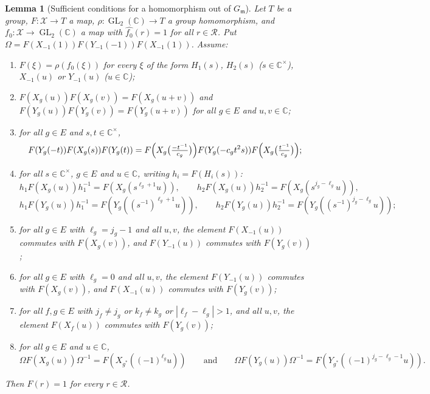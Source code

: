 \documentclass[11pt]{article}
\newtheorem{lemma}[theorem]{Lemma}
\theoremstyle{definition}
\theoremstyle{remark}
\newcommand{\CC}{\mathbb{C}}
\DeclareMathOperator{\GL}{GL}
\begin{document}
\begin{lemma}[Sufficient conditions for a homomorphism out of $G_{\mathfrak m}$]\label{lem:gm_rel_of}
Let $T$ be a group, $F\colon\mathcal X\to T$ a map, $\rho\colon\GL_2(\CC)\to T$ a group homomorphism, and $f_0\colon\mathcal X\to\GL_2(\CC)$ a map with $\widehat{f_0}(r)=1$ for all $r\in\mathcal R$. Put $\Omega=F(X_{-1}(1))F(Y_{-1}(-1))F(X_{-1}(1))$. Assume:
\begin{enumerate}
\item $F(\xi)=\rho(f_0(\xi))$ for every $\xi$ of the form $H_1(s)$, $H_2(s)$ ($s\in\CC^\times$), $X_{-1}(u)$ or $Y_{-1}(u)$ ($u\in\CC$);
\item $F(X_g(u))F(X_g(v))=F(X_g(u+v))$ and $F(Y_g(u))F(Y_g(v))=F(Y_g(u+v))$ for all $g\in E$ and $u,v\in\CC$;
\item for all $g\in E$ and $s,t\in\CC^\times$,
\[
F(Y_g(-t))F(X_g(s))F(Y_g(t))=F\Bigl(X_g\bigl(\tfrac{-t^{-1}}{c_g}\bigr)\Bigr)F(Y_g(-c_gt^2s))F\Bigl(X_g\bigl(\tfrac{t^{-1}}{c_g}\bigr)\Bigr);
\]
\item for all $s\in\CC^\times$, $g\in E$ and $u\in\CC$, writing $h_i=F(H_i(s))$:
\[
h_1F(X_g(u))h_1^{-1}=F(X_g(s^{\ell_g+1}u)),\qquad h_2F(X_g(u))h_2^{-1}=F(X_g(s^{j_g-\ell_g}u)),
\]
\[
h_1F(Y_g(u))h_1^{-1}=F(Y_g((s^{-1})^{\ell_g+1}u)),\qquad h_2F(Y_g(u))h_2^{-1}=F(Y_g((s^{-1})^{j_g-\ell_g}u));
\]
\item for all $g\in E$ with $\ell_g=j_g-1$ and all $u,v$, the element $F(X_{-1}(u))$ commutes with $F(X_g(v))$, and $F(Y_{-1}(u))$ commutes with $F(Y_g(v))$;
\item for all $g\in E$ with $\ell_g=0$ and all $u,v$, the element $F(Y_{-1}(u))$ commutes with $F(X_g(v))$, and $F(X_{-1}(u))$ commutes with $F(Y_g(v))$;
\item for all $f,g\in E$ with $j_f\ne j_g$ or $k_f\ne k_g$ or $|\ell_f-\ell_g|>1$, and all $u,v$, the element $F(X_f(u))$ commutes with $F(Y_g(v))$;
\item for all $g\in E$ and $u\in\CC$,
\[
\Omega F(X_g(u))\Omega^{-1}=F(X_{g^\ast}((-1)^{\ell_g}u))\qquad\text{and}\qquad \Omega F(Y_g(u))\Omega^{-1}=F(Y_{g^\ast}((-1)^{j_g-\ell_g-1}u)).
\]
\end{enumerate}
Then $\widehat F(r)=1$ for every $r\in\mathcal R$.
\end{lemma}
\end{document}
